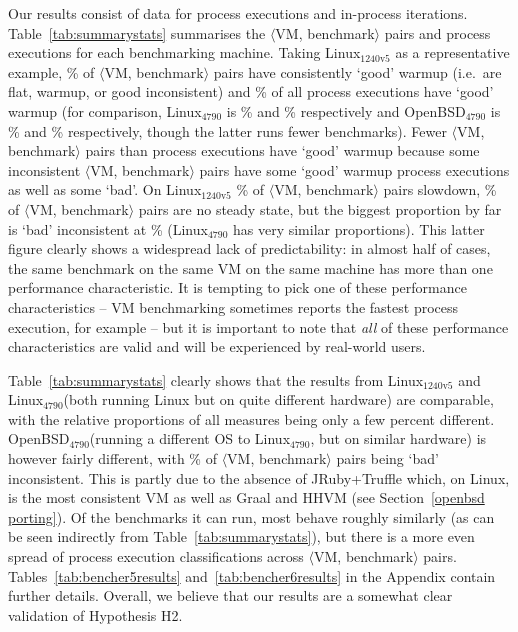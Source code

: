 \documentclass[acmsmall]{acmart}\settopmatter{printfolios=true}
\newcommand{\hyptwo}{H2\xspace}
\newcommand{\bencherfive}{Linux$_\mathrm{4790}$\xspace}
\newcommand{\benchersix}{OpenBSD$_\mathrm{4790}$\xspace}
\newcommand{\bencherseven}{Linux$_\mathrm{1240v5}$\xspace}
\newcommand{\vmbpair}{$\langle$VM, benchmark$\rangle$\xspace}
\begin{document}
Our results consist of data for \totalpexecs{} process executions and \totaliterations{} in-process
iterations. Table~\ref{tab:summarystats} summarises the \vmbpair pairs
and process executions for each benchmarking machine. Taking \bencherseven
as a representative example,
\bsevenresult\% of \vmbpair pairs have consistently `good' warmup (i.e.~are flat, warmup,
or good inconsistent) and
%
\result\% of all process executions have `good' warmup (for comparison, \bencherfive
is
\bfiveresult\% and
%
\result\% respectively and \benchersix is
\bsixresult\% and
%
\result\% respectively, though the latter runs fewer benchmarks).
Fewer \vmbpair pairs than process executions have `good'
warmup because some inconsistent \vmbpair pairs have some `good' warmup
process executions as well as some `bad'. On \bencherseven
\benchersevenvmbenchpairsslowdownpercentage\% of \vmbpair pairs slowdown,
\benchersevenvmbenchpairsnosteadystatepercentage\% of \vmbpair pairs are no steady state,
but the biggest proportion by far is `bad' inconsistent at \benchersevenvmbenchpairsbadinconsistentpercentage\%
(\bencherfive has very similar proportions). This latter figure clearly shows a
widespread lack of predictability: in almost half of cases, the same benchmark
on the same VM on the same machine has more than one performance characteristic.
It is tempting to pick one of these performance characteristics -- VM
benchmarking sometimes reports the fastest process execution, for example -- but
it is important to note that \emph{all} of these performance characteristics are
valid and will be experienced by real-world users.

Table~\ref{tab:summarystats} clearly shows that the results from \bencherseven
and \bencherfive (both running Linux but on quite different hardware) are
comparable, with the relative proportions of all measures being only a few
percent different. \benchersix (running a different OS to \bencherfive, but on similar hardware)
is however fairly different, with \benchersixvmbenchpairsbadinconsistentpercentage\%
of \vmbpair pairs being `bad' inconsistent. This is partly due to the absence of
JRuby+Truffle which, on Linux, is the most consistent VM as well as Graal and HHVM
(see Section~\ref{openbsd porting}). Of the benchmarks it can run, most behave
roughly similarly (as can be seen indirectly from Table~\ref{tab:summarystats}), but
there is a more even spread of process execution classifications across \vmbpair pairs.
Tables~\ref{tab:bencher5results} and~\ref{tab:bencher6results} in the Appendix
contain further details. Overall, we believe that our results are a
somewhat clear validation of Hypothesis \hyptwo.
\end{document}
